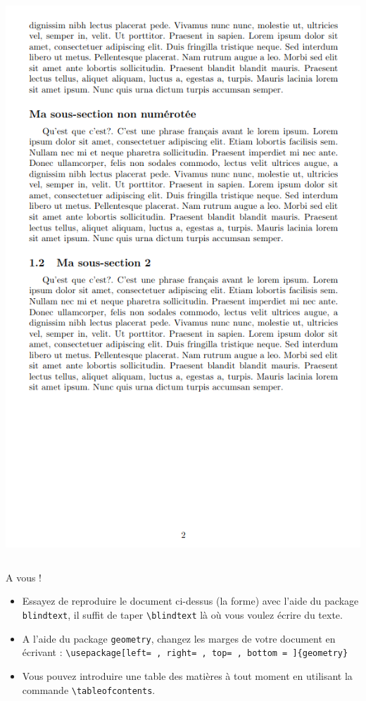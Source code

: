 \documentclass[handout]{beamer}
\begin{document}
\begin{frame}
\begin{columns}
		\includegraphics[scale=0.3]{ressources/testsection2}
	\end{columns}
	
\end{frame}

\begin{frame}{A vous !}
\begin{itemize}
	\item Essayez de reproduire le document ci-dessus (la forme) avec l'aide du package \texttt{blindtext}, il suffit de taper \texttt{\textbackslash blindtext} là où vous voulez écrire du texte.\\[11pt]
	\item A l'aide du package \texttt{geometry}, changez les marges de votre document en écrivant : \texttt{\textbackslash usepackage[left= , right= , top= , bottom = ]\{geometry\}}\\[11pt]
	\item Vous pouvez introduire une table des matières à tout moment en utilisant la commande \texttt{\textbackslash tableofcontents}.
\end{itemize}
\end{frame}
\end{document}
